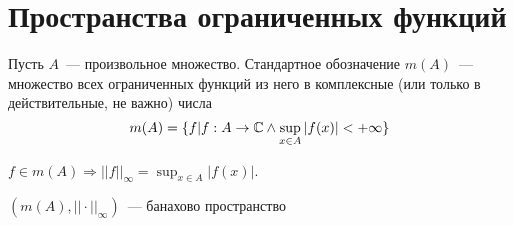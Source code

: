 \documentclass[document]{subfiles}
\begin{document}
\section{Пространства ограниченных функций}
\begin{definition}
    Пусть $A$~--- произвольное множество. Стандартное обозначение $m(A)$~--- множество всех ограниченных функций из него в комплексные (или только в действительные, не важно) числа
    \[ m(A) = \{ f | f: A \rightarrow \mathbb{C} \land \sup_{x \in A} |f(x)| < +\infty \} \]
\end{definition}

$f \in m(A) \Rightarrow ||f||_{\infty} = \sup_{x \in A} |f(x)|$.

\begin{theorem}
\label{theo:bounded-func-space-is-banach}
    $(m(A), || \cdot ||_{\infty})$~--- банахово пространство
\end{theorem}
\end{document}
